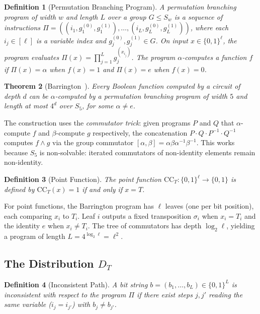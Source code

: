 \documentclass[11pt]{article}
\newtheorem{theorem}{Theorem}[section]
\newtheorem{definition}[theorem]{Definition}
\newcommand{\CC}{\mathrm{CC}}
\begin{document}
\begin{definition}[Permutation Branching Program]
A \emph{permutation branching program} of width $w$ and length $L$ over a group
$G \leq S_w$ is a sequence of instructions
$\Pi = ((i_1, g_1^{(0)}, g_1^{(1)}), \ldots, (i_L, g_L^{(0)}, g_L^{(1)}))$,
where each $i_j \in [\ell]$ is a variable index and $g_j^{(0)}, g_j^{(1)} \in G$.
On input $x \in \{0,1\}^\ell$, the program evaluates
$\Pi(x) = \prod_{j=1}^{L} g_j^{(x_{i_j})}$.
The program $\alpha$-\emph{computes} a function $f$ if $\Pi(x) = \alpha$ when
$f(x) = 1$ and $\Pi(x) = e$ when $f(x) = 0$.
\end{definition}

\begin{theorem}[Barrington~\cite{Bar89}]
\label{thm:barrington}
Every Boolean function computed by a circuit of depth $d$ can be
$\alpha$-computed by a permutation branching program of width $5$ and
length at most $4^d$ over $S_5$, for some $\alpha \neq e$.
\end{theorem}

The construction uses the \emph{commutator trick}: given programs $P$ and $Q$
that $\alpha$-compute $f$ and $\beta$-compute $g$ respectively, the concatenation
$P \cdot Q \cdot P^{-1} \cdot Q^{-1}$ computes $f \wedge g$ via the group
commutator $[\alpha, \beta] = \alpha\beta\alpha^{-1}\beta^{-1}$. This works because
$S_5$ is non-solvable: iterated commutators of non-identity elements remain
non-identity.

\begin{definition}[Point Function]
The point function $\CC_T : \{0,1\}^\ell \to \{0,1\}$ is defined by
$\CC_T(x) = 1$ if and only if $x = T$.
\end{definition}

For point functions, the Barrington program has $\ell$ leaves (one per bit position),
each comparing $x_i$ to $T_i$. Leaf $i$ outputs a fixed transposition $\sigma_i$
when $x_i = T_i$ and the identity $e$ when $x_i \neq T_i$. The tree of
commutators has depth $\log_2 \ell$, yielding a program of length $L = 4^{\log_2 \ell}
= \ell^2$.


\subsection{The Distribution $D_T$}

\begin{definition}[Inconsistent Path]
A bit string $b = (b_1, \ldots, b_L) \in \{0,1\}^L$ is \emph{inconsistent}
with respect to the program $\Pi$ if there exist steps $j, j'$ reading the
same variable ($i_j = i_{j'}$) with $b_j \neq b_{j'}$.
\end{definition}
\end{document}
